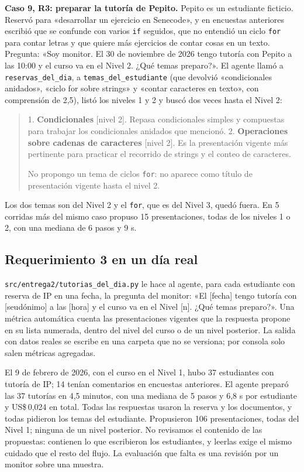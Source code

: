 \documentclass[11pt,letterpaper]{article}
\newcommand{\cod}[1]{\texttt{\small #1}}
\begin{document}
\textbf{Caso 9, R3: preparar la tutoría de Pepito.} Pepito es un estudiante ficticio. Reservó para «desarrollar un ejercicio en Senecode», y en encuestas anteriores escribió que se confunde con varios \cod{if} seguidos, que no entendió un ciclo \cod{for} para contar letras y que quiere más ejercicios de contar cosas en un texto. Pregunta: «Soy monitor. El 30 de noviembre de 2026 tengo tutoría con Pepito a las 10:00 y el curso va en el Nivel 2. ¿Qué temas preparo?». El agente llamó a \cod{reservas\_del\_dia}, a \cod{temas\_del\_estudiante} (que devolvió «condicionales anidados», «ciclo for sobre strings» y «contar caracteres en texto», con comprensión de 2,5), listó los niveles 1 y 2 y buscó dos veces hasta el Nivel 2:

\begin{quote}\small
1. \textbf{Condicionales} [nivel 2]. Repasa condicionales simples y compuestas para trabajar los condicionales anidados que mencionó.
2. \textbf{Operaciones sobre cadenas de caracteres} [nivel 2]. Es la presentación vigente más pertinente para practicar el recorrido de strings y el conteo de caracteres.

No propongo un tema de ciclos \cod{for}: no aparece como título de presentación vigente hasta el nivel 2.
\end{quote}

Los dos temas son del Nivel 2 y el \cod{for}, que es del Nivel 3, quedó fuera. En 5 corridas más del mismo caso propuso 15 presentaciones, todas de los niveles 1 o 2, con una mediana de 6 pasos y 9 s.

\subsection{Requerimiento 3 en un día real}
\label{sec:tutorias}

\cod{src/entrega2/tutorias\_del\_dia.py} le hace al agente, para cada estudiante con reserva de IP en una fecha, la pregunta del monitor: «El [fecha] tengo tutoría con [seudónimo] a las [hora] y el curso va en el Nivel [n]. ¿Qué temas preparo?». Una métrica automática cuenta las presentaciones vigentes que la respuesta propone en su lista numerada, dentro del nivel del curso o de un nivel posterior. La salida con datos reales se escribe en una carpeta que no se versiona; por consola solo salen métricas agregadas.

El 9 de febrero de 2026, con el curso en el Nivel 1, hubo 37 estudiantes con tutoría de IP; 14 tenían comentarios en encuestas anteriores. El agente preparó las 37 tutorías en 4,5 minutos, con una mediana de 5 pasos y 6,8 s por estudiante y US\$\,0,024 en total. Todas las respuestas usaron la reserva y los documentos, y todas pidieron los temas del estudiante. Propusieron 106 presentaciones, todas del Nivel 1; ninguna de un nivel posterior. No revisamos el contenido de las propuestas: contienen lo que escribieron los estudiantes, y leerlas exige el mismo cuidado que el resto del flujo. La evaluación que falta es una revisión por un monitor sobre una muestra.
\end{document}
